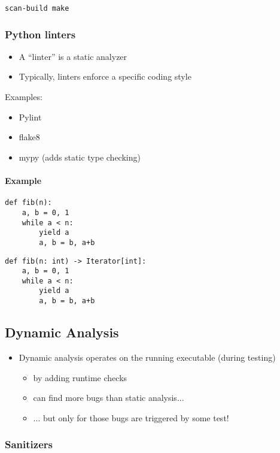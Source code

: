 \documentclass[12pt]{article}
\begin{document}
\begin{lstlisting}
scan-build make
\end{lstlisting}
\subsubsection{Python linters}
\begin{itemize}
\item A ``linter'' is a static analyzer
\item Typically, linters enforce a specific coding style
\end{itemize}

Examples:
\begin{itemize}
\item Pylint
\item flake8
\item mypy (adds static type checking)
\end{itemize}
\paragraph{Example}
\begin{lstlisting}
def fib(n):
    a, b = 0, 1
    while a < n:
        yield a
        a, b = b, a+b
\end{lstlisting}

\begin{lstlisting}
def fib(n: int) -> Iterator[int]:
    a, b = 0, 1
    while a < n:
        yield a
        a, b = b, a+b
\end{lstlisting}
\subsection{Dynamic Analysis}
\begin{itemize}
    \item Dynamic analysis operates on the running executable (during testing)
        \begin{itemize}
            \item by adding runtime checks
            \item can find more bugs than static analysis...
            \item ... but only for those bugs are triggered by some test!
        \end{itemize}
\end{itemize}
\subsubsection{Sanitizers}
\end{document}
